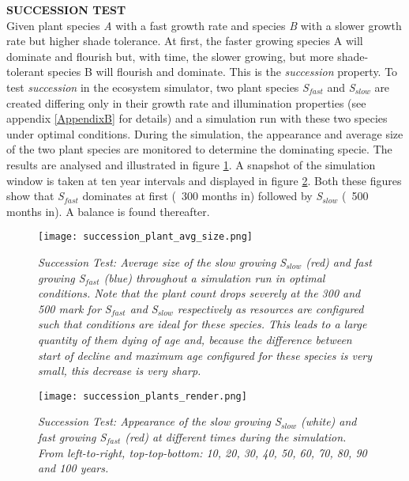 \textbf{SUCCESSION TEST}\\

Given plant species \textit{A} with a fast growth rate and species \textit{B} with a slower growth rate but higher shade tolerance. At first, the faster growing species A will dominate and flourish but, with time, the slower growing, but more shade-tolerant species B will flourish and dominate. This is the \textit{succession} property. To test \textit{succession} in the ecosystem simulator, two plant species \textit{S$_{fast}$} and \textit{S$_{slow}$} are created differing only in their growth rate and illumination properties (see appendix \ref{AppendixB} for details) and a simulation run with these two species under optimal conditions. During the simulation, the appearance and average size of the two plant species are monitored to determine the dominating specie. The results are analysed and illustrated in figure \ref{fig:succession_plants_avg_size}. A snapshot of the simulation window is taken at ten year intervals and displayed in figure \ref{fig:succession_plants_render}. Both these figures show that \textit{S$_{fast}$} dominates at first (~300 months in) followed by \textit{S$_{slow}$} (~500 months in). A balance is found thereafter.\\

\begin{figure}
\center
	\texttt{[image: succession\_plant\_avg\_size.png]}
	\caption{ \textit{Succession Test: Average size of the slow growing S$_{slow}$ (red) and fast growing S$_{fast}$ (blue) throughout a simulation run in optimal conditions. Note that the plant count drops severely at the 300 and 500 mark for S$_{fast}$ and S$_{slow}$ respectively as resources are configured such that conditions are ideal for these species. This leads to a large quantity of them dying of age and, because the difference between start of decline and maximum age configured for these species is very small, this decrease is very sharp.}}
	\label{fig:succession_plants_avg_size}
\end{figure}

\begin{figure}
\center
	\texttt{[image: succession\_plants\_render.png]}
	\caption{ \textit{Succession Test: Appearance of the slow growing S$_{slow}$ (white) and fast growing S$_{fast}$ (red) at different times during the simulation. From left-to-right, top-top-bottom: 10, 20, 30, 40, 50, 60, 70, 80, 90 and 100 years.}}
	\label{fig:succession_plants_render}
\end{figure}

